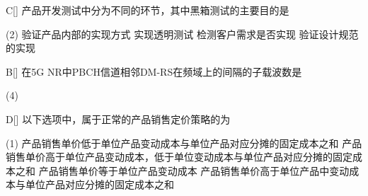 \begin{choice}{C}[]
    产品开发测试中分为不同的环节，其中黑箱测试的主要目的是
    \begin{tasks}(2)
        \task 验证产品内部的实现方式
        \task 实现透明测试
        \task 检测客户需求是否实现
        \task 验证设计规范的实现
    \end{tasks}
\end{choice}


\begin{choice}{B}[]
    在5G NR中PBCH信道相邻DM-RS在频域上的间隔的子载波数是
    \begin{tasks}(4)
    \end{tasks}
\end{choice}


\begin{choice}{D}[]
    以下选项中，属于正常的产品销售定价策略的为
    \begin{tasks}(1)
        \task 产品销售单价低于单位产品变动成本与单位产品对应分摊的固定成本之和
        \task 产品销售单价高于单位产品变动成本，低于单位变动成本与单位产品对应分摊的固定成本之和
        \task 产品销售单价等于单位产品变动成本
        \task 产品销售单价高于单位产品中变动成本与单位产品对应分摊的固定成本之和
    \end{tasks}
\end{choice}

